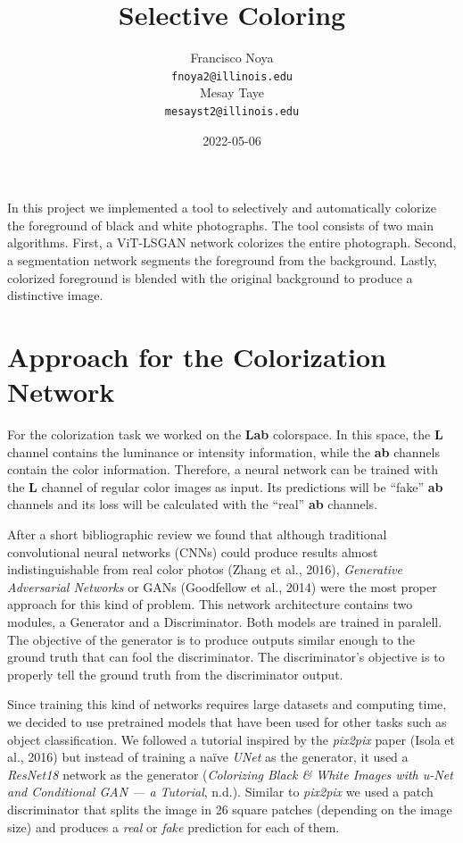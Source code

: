 \documentclass[
]{article}
\title{Selective Coloring}
\author{Francisco Noya\\ \texttt{fnoya2@illinois.edu}\\
\And Mesay Taye\\ \texttt{mesayst2@illinois.edu} \\
}
\date{2022-05-06}
\begin{document}
\maketitle

In this project we implemented a tool to selectively and automatically
colorize the foreground of black and white photographs. The tool
consists of two main algorithms. First, a ViT-LSGAN network colorizes
the entire photograph. Second, a segmentation network segments the
foreground from the background. Lastly, colorized foreground is blended
with the original background to produce a distinctive image.

\hypertarget{approach-for-the-colorization-network}{%
\section{Approach for the Colorization
Network}\label{approach-for-the-colorization-network}}

For the colorization task we worked on the \textbf{Lab} colorspace. In
this space, the \textbf{L} channel contains the luminance or intensity
information, while the \textbf{ab} channels contain the color
information. Therefore, a neural network can be trained with the
\textbf{L} channel of regular color images as input. Its predictions
will be ``fake'' \textbf{ab} channels and its loss will be calculated
with the ``real'' \textbf{ab} channels.

After a short bibliographic review we found that although traditional
convolutional neural networks (CNNs) could produce results almost
indistinguishable from real color photos (Zhang et al., 2016),
\emph{Generative Adversarial Networks} or GANs (Goodfellow et al., 2014)
were the most proper approach for this kind of problem. This network
architecture contains two modules, a Generator and a Discriminator. Both
models are trained in paralell. The objective of the generator is to
produce outputs similar enough to the ground truth that can fool the
discriminator. The discriminator's objective is to properly tell the
ground truth from the discriminator output.

Since training this kind of networks requires large datasets and
computing time, we decided to use pretrained models that have been used
for other tasks such as object classification. We followed a tutorial
inspired by the \emph{pix2pix} paper (Isola et al., 2016) but instead of
training a naïve \emph{UNet} as the generator, it used a \emph{ResNet18}
network as the generator (\emph{Colorizing Black \& White Images with
u-Net and Conditional GAN --- a Tutorial}, n.d.). Similar to
\emph{pix2pix} we used a patch discriminator that splits the image in 26
square patches (depending on the image size) and produces a \emph{real}
or \emph{fake} prediction for each of them.
\end{document}
